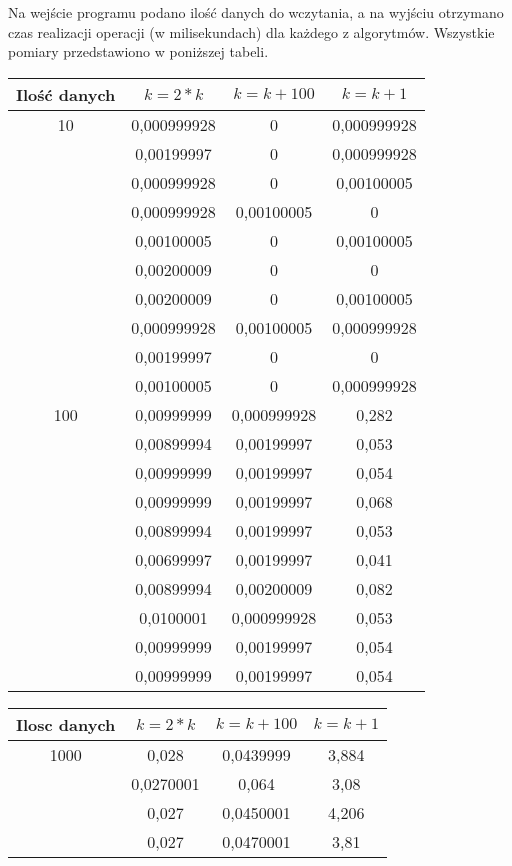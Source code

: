 \documentclass[10pt, a4paper]{article}
\begin{document}
\begin{flushleft}
Na wejście programu podano ilość danych do wczytania, a na wyjściu otrzymano czas realizacji operacji (w milisekundach) dla każdego z algorytmów. Wszystkie pomiary przedstawiono w poniższej tabeli.

\begin{table}[h]
\centering
\begin{tabular}{|c|c|c|c|} \hline
Ilość danych & $k=2*k$ & $k=k+100$ & $k=k+1$ \\ \hline
10 & 0,000999928 & 0 & 0,000999928 \\
 & 0,00199997 & 0 & 0,000999928 \\
 & 0,000999928 & 0 & 0,00100005 \\
 & 0,000999928 & 0,00100005 & 0 \\
 & 0,00100005 & 0 & 0,00100005 \\
 & 0,00200009 & 0 & 0 \\
 & 0,00200009 & 0 & 0,00100005 \\
 & 0,000999928 & 0,00100005 &  0,000999928 \\
 & 0,00199997 & 0 & 0 \\
 & 0,00100005 & 0 & 0,000999928 \\ \hline
100 & 0,00999999 & 0,000999928 & 0,282 \\
 & 0,00899994 & 0,00199997 & 0,053 \\
 & 0,00999999 & 0,00199997 & 0,054 \\
 & 0,00999999 & 0,00199997 & 0,068 \\
 & 0,00899994 & 0,00199997 & 0,053 \\
 & 0,00699997 & 0,00199997 & 0,041 \\
 & 0,00899994 & 0,00200009 & 0,082 \\
 & 0,0100001 & 0,000999928 & 0,053 \\
 & 0,00999999 & 0,00199997 & 0,054 \\
 & 0,00999999 & 0,00199997 & 0,054 \\ \hline
\end{tabular}
\end{table}
\newpage
\begin{table}[h]
\centering
\begin{tabular}{|c|c|c|c|} \hline
Ilosc danych & $k=2*k$ & $k=k+100$ & $k=k+1$ \\ \hline
1000 & 0,028 & 0,0439999 & 3,884 \\
 & 0,0270001 & 0,064 & 3,08 \\
 & 0,027 & 0,0450001 & 4,206 \\
 & 0,027 & 0,0470001 & 3,81 \\

\end{tabular}
\end{table}
\end{flushleft}
\end{document}
